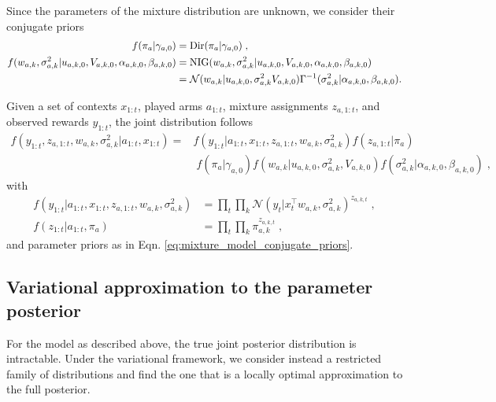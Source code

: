 \documentclass[10pt]{article}
\newcommand{\N}{\mathcal{N}}
\newcommand{\Dir}{{\rm Dir}}
\newcommand{\NIG}{{\rm NIG}}
\begin{document}
Since the parameters of the mixture distribution are unknown, we consider their conjugate priors
\begin{equation}
\begin{split}
f(\pi_{a}|\gamma_{a,0}) &=\Dir(\pi_a|\gamma_{a,0}) \; ,\\
f(w_{a,k}, \sigma_{a,k}^2|u_{a,k,0}, V_{a,k,0},\alpha_{a,k,0}, \beta_{a,k,0}) &= \NIG(w_{a,k}, \sigma_{a,k}^2 |u_{a,k,0}, V_{a,k,0},\alpha_{a,k,0}, \beta_{a,k,0}) \\
&= \N(w_{a,k}|u_{a,k,0}, \sigma_{a,k}^2V_{a,k,0}) \Gamma^{-1}(\sigma_{a,k}^2|\alpha_{a,k,0}, \beta_{a,k,0}). \\
\end{split}
\label{eq:mixture_model_conjugate_priors}
\end{equation}

Given a set of contexts $x_{1:t}$, played arms $a_{1:t}$, mixture assignments $z_{a,1:t}$, and observed rewards $y_{1:t}$, the joint distribution follows
\begin{equation}
\begin{split}
f(y_{1:t}, z_{a,1:t}, w_{a,k}, \sigma_{a,k}^2|a_{1:t}, x_{1:t}) = & f(y_{1:t}|a_{1:t}, x_{1:t}, z_{a,1:t}, w_{a,k}, \sigma_{a,k}^2) f(z_{a,1:t}|\pi_{a}) \\
& \; f(\pi_{a}|\gamma_{a,0}) f(w_{a,k} |u_{a,k,0},\sigma_{a,k}^2, V_{a,k,0}) f(\sigma_{a,k}^2|\alpha_{a,k,0}, \beta_{a,k,0})\;,
\end{split}
\end{equation}
with 
\begin{equation}
\begin{split}
f(y_{1:t}|a_{1:t}, x_{1:t}, z_{a,1:t}, w_{a,k}, \sigma_{a,k}^2) &= \prod_{t} \prod_k \N(y_t|x_t^\top w_{a,k}, \sigma_{a,k}^2)^{z_{a,k,t}} \;,\\
f(z_{1:t}|a_{1:t},\pi_a) &= \prod_t \prod_k \pi_{a,k}^{z_{a,k,t}} \;,
\end{split}
\end{equation}
and parameter priors as in Eqn. \ref{eq:mixture_model_conjugate_priors}.

\subsection{Variational approximation to the parameter posterior}
\label{ssec:variational_distribution}

For the model as described above, the true joint posterior distribution is intractable. Under the variational framework, we consider instead a restricted family of distributions and find the one that is a locally optimal approximation to the full posterior.
\end{document}
